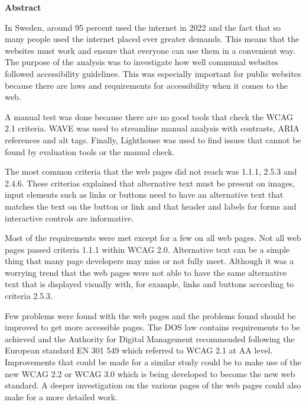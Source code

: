 \documentclass[11p]{article}
\begin{document}
    \begin{center}
        \large
        \vspace{0.9cm}
        \textbf{Abstract}
    \end{center}
    In Sweden, around 95 percent used the internet in 2022 \textcite{SCB} and the fact that so many people used the internet placed ever greater demands.
    This means that the websites must work and ensure that everyone can use them in a convenient way.
    The purpose of the analysis was to investigate how well communal websites followed accessibility guidelines.
    This was especially important for public websites because there are laws and requirements for accessibility when it comes to the web.

    A manual test was done because there are no good tools that check the WCAG 2.1 criteria.
    WAVE was used to streamline manual analysis with contrasts, ARIA references and alt tags.
    Finally, Lighthouse was used to find issues that cannot be found by evaluation tools or the manual check.

    The most common criteria that the web pages did not reach was 1.1.1, 2.5.3 and 2.4.6.
    These criterias explained that alternative text must be present on images, input elements such as links or buttons need to have an alternative text that matches the text on the button or link and that header and labels for forms and interactive controls are informative.

    Most of the requirements were met except for a few on all web pages.
    Not all web pages passed criteria 1.1.1 within WCAG 2.0.
    Alternative text can be a simple thing that many page developers may miss or not fully meet.
    Although it was a worrying trend that the web pages were not able to have the same alternative text that is displayed visually with, for example, links and buttons according to criteria 2.5.3.

    Few problems were found with the web pages and the problems found should be improved to get more accessible pages.
    The DOS law contains requirements to be achieved and the Authority for Digital Management recommended following the European standard EN 301 549 which referred to WCAG 2.1 at AA level.
    Improvements that could be made for a similar study could be to make use of the new WCAG 2.2 or WCAG 3.0 which is being developed to become the new web standard.
    A deeper investigation on the various pages of the web pages could also make for a more detailed work.
\end{document}
